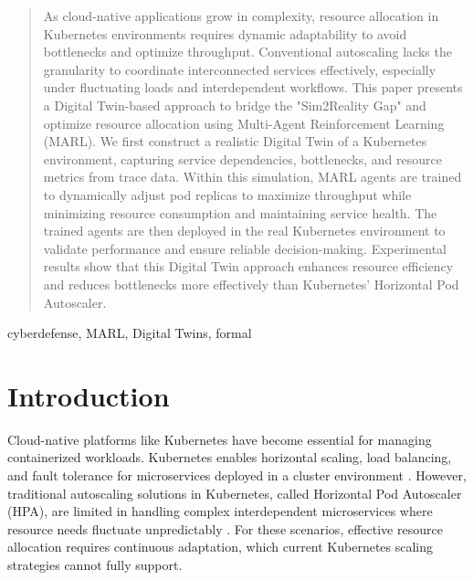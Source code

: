 \documentclass[conference]{IEEEtran}
\begin{document}
\maketitle

\begin{abstract}
    As cloud-native applications grow in complexity, resource allocation in Kubernetes environments requires dynamic adaptability to avoid bottlenecks and optimize throughput.
    Conventional autoscaling lacks the granularity to coordinate interconnected services effectively, especially under fluctuating loads and interdependent workflows.
    This paper presents a Digital Twin-based approach to bridge the "Sim2Reality Gap" and optimize resource allocation using Multi-Agent Reinforcement Learning (MARL). We first construct a realistic Digital Twin of a Kubernetes environment, capturing service dependencies, bottlenecks, and resource metrics from trace data. Within this simulation, MARL agents are trained to dynamically adjust pod replicas to maximize throughput while minimizing resource consumption and maintaining service health. The trained agents are then deployed in the real Kubernetes environment to validate performance and ensure reliable decision-making.
    Experimental results show that this Digital Twin approach enhances resource efficiency and reduces bottlenecks more effectively than Kubernetes’ Horizontal Pod Autoscaler.
\end{abstract}

\begin{IEEEkeywords}
    cyberdefense, MARL, Digital Twins, formal
\end{IEEEkeywords}

\section{Introduction}

Cloud-native platforms like Kubernetes have become essential for managing containerized workloads. Kubernetes enables horizontal scaling, load balancing, and fault tolerance for microservices deployed in a cluster environment \cite{hpa_design}. However, traditional autoscaling solutions in Kubernetes, called Horizontal Pod Autoscaler (HPA), are limited in handling complex interdependent microservices where resource needs fluctuate unpredictably \cite{rosenberg_k8s_autoscaling}. For these scenarios, effective resource allocation requires continuous adaptation, which current Kubernetes scaling strategies cannot fully support.
\end{document}
